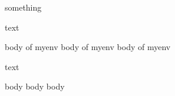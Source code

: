 \if something \fi

text

\begin{myenv}
  body of myenv
  body of myenv
  body of myenv \end{myenv}

text

\begin{anotherenv}
  body
  body
  body
\end{anotherenv}

